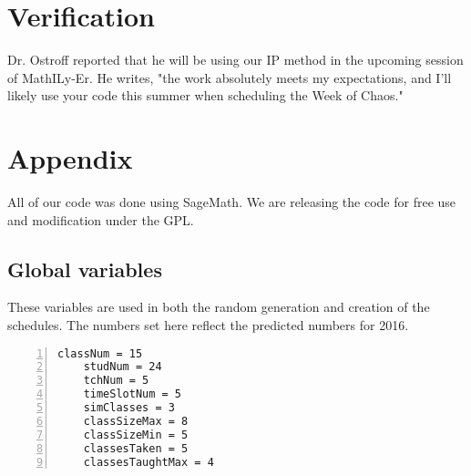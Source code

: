 \documentclass[11pt]{article}
\begin{document}
\section{Verification}

Dr. Ostroff reported that he will be using our IP method in the upcoming session of MathILy-Er. He writes, "the work absolutely meets my expectations, and I’ll likely use your code this summer when scheduling the Week of Chaos."


\section{Appendix}
All of our code was done using SageMath. We are releasing the code for free use and modification under the GPL.

\subsection{Global variables}
These variables are used in both the random generation and creation of the schedules. The numbers set here reflect the predicted numbers for 2016.
\begin{lstlisting}[numbers=left,numberstyle=\tiny,numbersep=0pt]
    classNum = 15
    studNum = 24
    tchNum = 5
    timeSlotNum = 5
    simClasses = 3
    classSizeMax = 8
    classSizeMin = 5
    classesTaken = 5
    classesTaughtMax = 4
\end{lstlisting}
\end{document}
